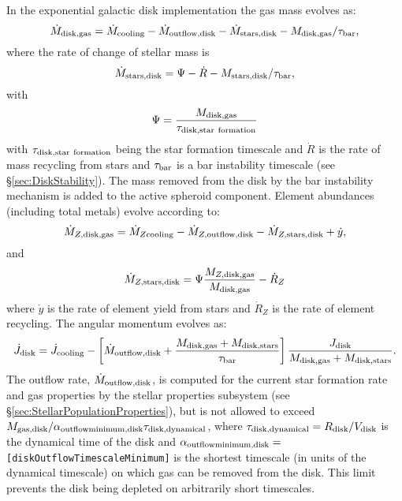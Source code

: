 In the exponential galactic disk implementation the gas mass evolves as:
\begin{equation}
 \dot{M}_{\rm disk, gas} = \dot{M}_{\rm cooling} - \dot{M}_{\rm outflow, disk} - \dot{M}_{\rm stars, disk} - M_{\rm disk, gas}/\tau_{\rm bar},
\end{equation}
where the rate of change of stellar mass is
\begin{equation}
 \dot{M}_{\rm stars, disk} = \Psi - \dot{R} - M_{\rm stars,disk}/\tau_{\rm bar},
\end{equation}
with
\begin{equation}
 \Psi = {M_{\rm disk, gas} \over \tau_{\rm disk, star~formation}}
\end{equation}
with $\tau_{\rm disk, star~formation}$ being the star formation timescale and $\dot{R}$ is the rate of mass recycling from stars and $\tau_{\rm bar}$ is a bar instability timescale (see \S\ref{sec:DiskStability}). The mass removed from the disk by the bar instability mechanism is added to the active spheroid component.
Element abundances (including total metals) evolve according to:
\begin{equation}
  \dot{M}_{Z, {\rm disk, gas}} = \dot{M}_{Z {\rm cooling}} - \dot{M}_{Z, {\rm outflow, disk}} - \dot{M}_{Z, {\rm stars, disk}} + \dot{y},
\end{equation}
and
\begin{equation}
 \dot{M}_{Z, {\rm stars, disk}} = \Psi {M_{Z, {\rm disk, gas}} \over M_{\rm disk, gas}} - \dot{R}_Z
\end{equation}
where $\dot{y}$ is the rate of element yield from stars and $\dot{R}_Z$ is the rate of element recycling. The angular momentum evolves as:
\begin{equation}
 \dot{J}_{\rm disk} = \dot{J}_{\rm cooling} - \left[ \dot{M}_{\rm outflow, disk} + {M_{\rm disk, gas}  + M_{\rm disk, stars} \over \tau_{\rm bar}}\right] {J_{\rm disk} \over M_{\rm disk, gas} + M_{\rm disk, stars}}.
\end{equation}
The outflow rate, $\dot{M}_{\rm outflow, disk}$, is computed for the current star formation rate and gas properties by the stellar properties subsystem (see \S\ref{sec:StellarPopulationProperties}), but is not allowed to exceed $M_{\rm gas, disk}/ \alpha_{\rm outflow minimum, disk} \tau_{\rm disk, dynamical}$, where $\tau_{\rm disk, dynamical}=R_{\rm disk}/V_{\rm disk}$ is the dynamical time of the disk and $\alpha_{\rm outflow minimum, disk}=${\tt [diskOutflowTimescaleMinimum]} is the shortest timescale (in units of the dynamical timescale) on which gas can be removed from the disk. This limit prevents the disk being depleted on arbitrarily short timescales.


